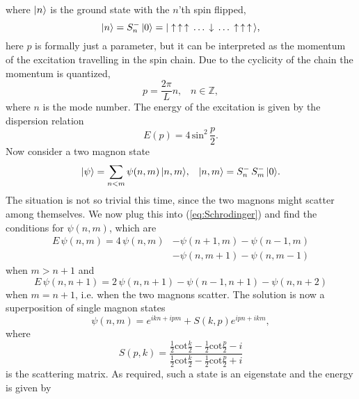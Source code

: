 where $|n\rangle$ is the ground state with the $n$'th spin flipped,
\begin{equation}
	|n\rangle = S^-_n \, |0\rangle = |\uparrow \, \uparrow \, \uparrow \, \dots \, \downarrow \, \dots \, \uparrow \, \uparrow \, \uparrow \,\rangle,
\end{equation}
here $p$ is formally just a parameter, but it can be interpreted as the momentum of the excitation travelling in the spin chain. Due to the cyclicity of the chain the momentum is quantized,
\begin{equation}
	p = \frac{2\pi}{L} n, \,\,\,\,\, n \in \mathbb{Z},
\end{equation}
where $n$ is the mode number. The energy of the excitation is given by the dispersion relation
\begin{equation}
	E(p) = 4 \, \mathrm{sin}^2 \, \frac{p}{2}.
	\label{eq:magnon_energy}
\end{equation}
Now consider a two magnon state
\begin{equation}
	|\psi\rangle = \sum_{n<m} \psi(n, m) \, |n,m\rangle,  \,\,\,\,\, |n,m\rangle = S^-_n \, S^-_m \, |0\rangle.
\end{equation}
The situation is not so trivial this time, since the two magnons might scatter among themselves. We now plug this into (\ref{eq:Schrodinger}) and find the conditions for $\psi(n,m)$, which are
\begin{equation}
\begin{split}
	E \, \psi(n,m) = 4 \, \psi(n,m) & -  \psi(n+1,m)  -  \psi(n-1,m) \\ 
	                              & -  \psi(n, m+1)  -  \psi(n, m-1)
\end{split}
\end{equation}
when $m > n+1$ and
\begin{equation}
	E \, \psi(n, n+1) = 2 \, \psi(n, n+1) - \psi(n-1, n+1) - \psi(n, n+2)
\end{equation}
when $m = n+1$, i.e. when the two magnons scatter. The solution is now a superposition of single magnon states
\begin{equation}
	\psi(n,m) = e^{ikn + ipm} + S(k,p) e^{ipn + ikm},
\end{equation}
where
\begin{equation}
	S(p,k) = \frac{\frac{1}{2} \mathrm{cot} \frac{k}{2} - \frac{1}{2} \mathrm{cot} \frac{p}{2} - i}{\frac{1}{2} \mathrm{cot} \frac{k}{2} - \frac{1}{2} \mathrm{cot} \frac{p}{2} + i}
\end{equation}
is the scattering matrix. As required, such a state is an eigenstate and the energy is given by
